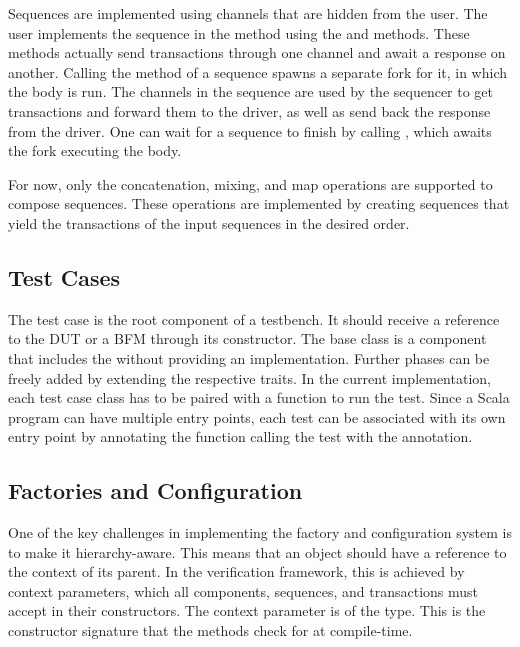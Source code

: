 Sequences are implemented using channels that are hidden from the user. The user implements the sequence in the
 method using the  and  methods. These methods actually send
transactions through one channel and await a response on another. Calling the  method of a sequence spawns a
separate fork for it, in which the body is run. The channels in the sequence are used by the sequencer to get
transactions and forward them to the driver, as well as send back the response from the driver. One can wait for a
sequence to finish by calling , which awaits the fork executing the body.

For now, only the concatenation, mixing, and map operations are supported to compose sequences. These operations are implemented by creating sequences that yield the transactions of the input sequences in the desired order. 

\subsection{Test Cases} %

The test case is the root component of a testbench. It should receive a reference to the DUT or a BFM through its
constructor. The  base class is a component that includes the  without providing an
implementation. Further phases can be freely added by extending the respective traits. In the current implementation,
each test case class has to be paired with a  function to run the test. Since a Scala program
can have multiple entry points, each test can be associated with its own entry point by annotating the function
calling the test with the  annotation.

\subsection{Factories and Configuration} %

One of the key challenges in implementing the factory and configuration system is to make it hierarchy-aware. This means that an object should have a reference to the context of its parent. In the verification framework, this is achieved by context parameters, which all components, sequences, and transactions must accept in their constructors. The context parameter is of the  type. This is the constructor signature that the  methods check for at compile-time. 

